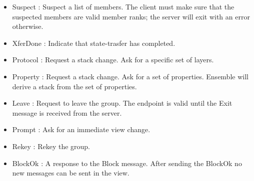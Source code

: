 \begin{itemize}
\item{Suspect} : Suspect a list of members. The client must make sure
  that the suspected members are valid member ranks; the server will exit with an error otherwise. 
\begin{FormatTable}
\end{FormatTable}

\item{XferDone} : Indicate that state-trasfer has completed. 
\begin{FormatTable}
\end{FormatTable}

\item{Protocol} : Request a stack change. Ask for a specific set of
  layers. 
\begin{FormatTable}
\end{FormatTable}

\item{Property} : Request a stack change. Ask for a set of
  properties. Ensemble will derive a stack from the set of
  properties. 
\begin{FormatTable}
\end{FormatTable}

\item{Leave} : Request to leave the group. The endpoint is valid until
  the Exit message is received from the server. 
\begin{FormatTable}
\end{FormatTable}

\item{Prompt} : Ask for an immediate view change. 
\begin{FormatTable}
\end{FormatTable}

\item{Rekey} : Rekey the group. 
\begin{FormatTable}
\end{FormatTable}

\item{BlockOk} : A response to the Block message. After sending the
  BlockOk no new messages can be sent in the view. 
\begin{FormatTable}
\end{FormatTable}
\end{itemize}

